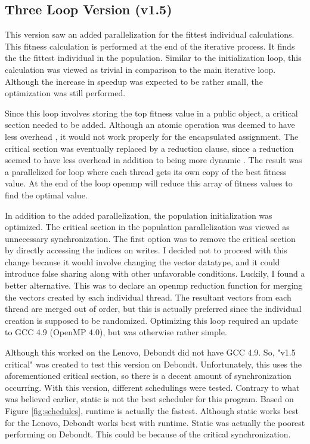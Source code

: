 \documentclass[10pt,letterpaper]{article}
\begin{document}
\subsection{Three Loop Version (v1.5)}
This version saw an added parallelization for the fittest individual calculations. This fitness calculation is performed at the end of the iterative process. It finds the the fittest individual in the population. Similar to the initialization loop, this calculation was viewed as trivial in comparison to the main iterative loop. Although the increase in speedup was expected to be rather small, the optimization was still performed. 

Since this loop involves storing the top fitness value in a public object, a critical section needed to be added. Although an atomic operation was deemed to have less overhead \cite{atomicoverhead}, it would not work properly for the encapsulated assignment. The critical section was eventually replaced by a reduction clause, since a reduction seemed to have less overhead in addition to being more dynamic \cite{suss2008common}. The result was a parallelized for loop where each thread gets its own copy of the best fitness value. At the end of the loop openmp will reduce this array of fitness values to find the optimal value.

In addition to the added parallelization, the population initialization was optimized. The critical section in the population parallelization was viewed as unnecessary synchronization. The first option was to remove the critical section by directly accessing the indices on writes. I decided not to proceed with this change because it would involve changing the vector datatype, and it could introduce false sharing along with other unfavorable conditions. Luckily, I found a better alternative. This was to declare an openmp reduction function for merging the vectors created by each individual thread. The resultant vectors from each thread are merged out of order, but this is actually preferred since the individual creation is supposed to be randomized. Optimizing this loop required an update to GCC 4.9 (OpenMP 4.0), but was otherwise rather simple.

Although this worked on the Lenovo, Debondt did not have GCC 4.9. So, "v1.5 critical" was created to test this version on Debondt. Unfortunately, this uses the aforementioned critical section, so there is a decent amount of synchronization occurring. With this version, different schedulings were tested. Contrary to what was believed earlier, static is not the best scheduler for this program. Based on Figure \ref{fig:schedules}, runtime is actually the fastest. Although static works best for the Lenovo, Debondt works best with runtime. Static was actually the poorest performing on Debondt. This could be because of the critical synchronization.
\end{document}
